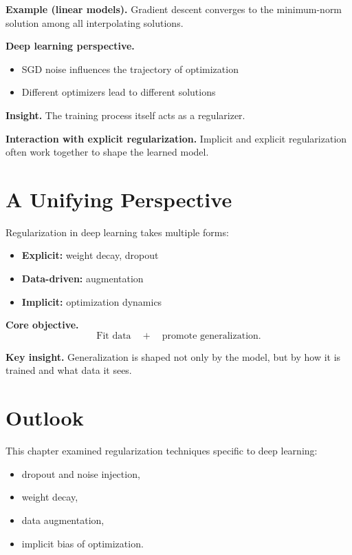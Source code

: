 \medskip

\noindent
\textbf{Example (linear models).}  
Gradient descent converges to the minimum-norm solution among all interpolating solutions.

\medskip

\noindent
\textbf{Deep learning perspective.}
\begin{itemize}
    \item SGD noise influences the trajectory of optimization
    \item Different optimizers lead to different solutions
\end{itemize}

\medskip

\noindent
\textbf{Insight.}  
The training process itself acts as a regularizer.

\medskip

\noindent
\textbf{Interaction with explicit regularization.}  
Implicit and explicit regularization often work together to shape the learned model.

\section{A Unifying Perspective}

Regularization in deep learning takes multiple forms:

\begin{itemize}
    \item \textbf{Explicit:} weight decay, dropout
    \item \textbf{Data-driven:} augmentation
    \item \textbf{Implicit:} optimization dynamics
\end{itemize}

\medskip

\noindent
\textbf{Core objective.}
\[
\text{Fit data} \quad + \quad \text{promote generalization}.
\]

\medskip

\noindent
\textbf{Key insight.}  
Generalization is shaped not only by the model, but by how it is trained and what data it sees.

\section{Outlook}

This chapter examined regularization techniques specific to deep learning:
\begin{itemize}
    \item dropout and noise injection,
    \item weight decay,
    \item data augmentation,
    \item implicit bias of optimization.
\end{itemize}

